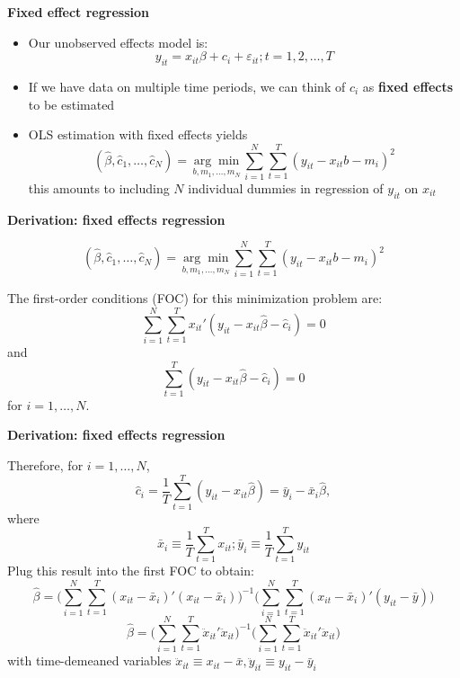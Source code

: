 \documentclass[notes=show]{beamer}
\begin{document}
\begin{frame}[plain]
	\begin{center}
	\textbf{Fixed effect regression}
	\end{center}
	
	\begin{itemize}
	\item Our unobserved effects model is:$$y_{it} = x_{it}\beta + c_i + \varepsilon_{it}; t=1,2,\dots,T$$
	\item If we have data on multiple time periods, we can think of $c_i$ as \textbf{fixed effects} to be estimated
	\item OLS estimation with fixed effects yields$$(\widehat{\beta}, \widehat{c}_1, \dots, \widehat{c}_N) = \underset{b,m_1,\dots,m_N}{\arg\!\min} \sum_{i=1}^N\sum_{t=1}^T (y_{it} - x_{it}b - m_i)^2$$this amounts to including $N$ individual dummies in regression of $y_{it}$ on $x_{it}$
	\end{itemize}
\end{frame}

\begin{frame}[plain]
	\begin{center}
	\textbf{Derivation: fixed effects regression}
	\end{center}
	
$$(\widehat{\beta}, \widehat{c}_1, \dots, \widehat{c}_N) = \underset{b,m_1,\dots,m_N}{\arg\!\min} \sum_{i=1}^N\sum_{t=1}^T (y_{it} - x_{it}b - m_i)^2$$

The first-order conditions (FOC) for this minimization problem are: $$\sum_{i=1}^N \sum_{t=1}^T x_{it}'(y_{it} - x_{it}\widehat{\beta} - \widehat{c}_i)=0$$ and $$\sum_{t=1}^T(y_{it} - x_{it}\widehat{\beta} - \widehat{c}_i) = 0 $$ for $i=1,\dots,N$.
	
\end{frame}

\begin{frame}[shrink=20,plain]
	\begin{center}
	\textbf{Derivation: fixed effects regression}
	\end{center}
	
Therefore, for $i=1, \dots, N$,$$\widehat{c}_i = \frac{1}{T} \sum_{t=1}^T(y_{it}-x_{it}\widehat{\beta})=\bar{y}_i-\bar{x}_i\widehat{\beta},$$where$$\bar{x}_i \equiv \frac{1}{T}\sum_{t=1}^Tx_{it}; \bar{y}_i \equiv \frac{1}{T} \sum_{t=1}^T y_{it}$$
Plug this result into the first FOC to obtain:$$\widehat{\beta} = \bigg( \sum_{i=1}^N \sum_{t=1}^T (x_{it} - \bar{x}_i)'(x_{it} - \bar{x}_i) \bigg)^{-1} \bigg( \sum_{i=1}^N \sum_{t=1}^T (x_{it} - \bar{x}_i)'(y_{it} - \bar{y})\bigg)$$ $$\widehat{\beta} = \bigg(\sum_{i=1}^N \sum_{t=1}^T \ddot{x}_{it}'\ddot{x}_{it} \bigg)^{-1} \bigg( \sum_{i=1}^N \sum_{t=1}^T \ddot{x}_{it}' \ddot{x}_{it} \bigg)$$
with time-demeaned variables $\ddot{x}_{it} \equiv x_{it}-\bar{x},\ddot{y}_{it} \equiv y_{it} - \bar{y}_i$
\end{frame}
\end{document}
